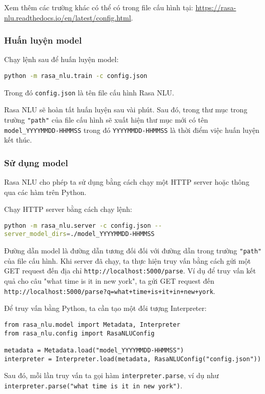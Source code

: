 Xem thêm các trường khác có thể có trong file cấu hình tại: \url{https://rasa-nlu.readthedocs.io/en/latest/config.html}.

\subsubsection{Huấn luyện model}

Chạy lệnh sau để huấn luyện model:

\lstinline[language=bash]{python -m rasa_nlu.train -c config.json}

Trong đó \lstinline{config.json} là tên file cấu hình Rasa NLU.

Rasa NLU sẽ hoàn tất huấn luyện sau vài phút. Sau đó, trong thư mục trong trường \lstinline{"path"} của file cấu hình sẽ xuất hiện thư mục mới có tên \lstinline{model_YYYYMMDD-HHMMSS} trong đó \lstinline{YYYYMMDD-HHMMSS} là thời điểm việc huấn luyện kết thúc.

\subsubsection{Sử dụng model}

Rasa NLU cho phép ta sử dụng bằng cách chạy một HTTP server hoặc thông qua các hàm trên Python.

Chạy HTTP server bằng cách chạy lệnh:

\lstinline[language=bash]{python -m rasa_nlu.server -c config.json --server_model_dirs=./model_YYYYMMDD-HHMMSS}

Đường dẫn model là đường dẫn tương đối đối với đường dẫn trong trường \lstinline{"path"} của file cấu hình. Khi server đã chạy, ta thực hiện truy vấn bằng cách gửi một GET request đến địa chỉ \lstinline{http://localhost:5000/parse}. Ví dụ để truy vấn kết quả cho câu "what time is it in new york", ta gửi GET request đến \lstinline[language=bash]{http://localhost:5000/parse?q=what+time+is+it+in+new+york}.

Để truy vấn bằng Python, ta cần tạo một đối tượng Interpreter:

\begin{lstlisting}
from rasa_nlu.model import Metadata, Interpreter
from rasa_nlu.config import RasaNLUConfig

metadata = Metadata.load("model_YYYYMMDD-HHMMSS")
interpreter = Interpreter.load(metadata, RasaNLUConfig("config.json"))
\end{lstlisting}

Sau đó, mỗi lần truy vấn ta gọi hàm \lstinline{interpreter.parse}, ví dụ như \lstinline{interpreter.parse("what time is it in new york")}.

